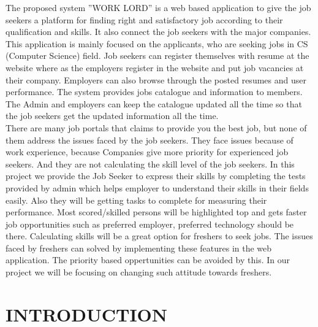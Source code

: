 \documentclass[a4paper,12pt]{report}
\begin{document}
The proposed system ”WORK LORD” is a web based application to give the
job seekers a platform for finding right and satisfactory job according to their qualification and skills. It also connect the job seekers with the major companies. This application is mainly focused on the applicants, who are seeking jobs in CS (Computer
Science) field. Job seekers can register themselves with resume at the website where as the
employers register in the website and put job vacancies at their
company. Employers can also browse through the posted resumes and user performance. The system provides jobs catalogue and information to members. The Admin and employers can
keep the catalogue updated all the time so that the job seekers get the updated information all the time.\\

There are many job portals that claims to provide you the best job, but none
of them address the issues faced by the job seekers. They face issues because of work experience, because Companies give more priority for experienced job seekers. And they are not calculating the skill level of the job seekers. In this project we provide the Job Seeker to express their skills by completing the tests provided by admin which helps employer to understand their skills in their fields easily. Also they will
be getting tasks to complete for measuring their performance. Most
scored/skilled persons will be highlighted top and gets faster job opportunities such as preferred employer, preferred technology should be there. Calculating skills will be a great option for freshers to seek jobs. The issues faced by freshers can solved by implementing these features in the web application. The priority based oppertunities can be avoided by this. In our project we will be focusing on changing
such attitude towards freshers.\\


\pagebreak

\tableofcontents{}
\pagebreak


\pagebreak

\listoffigures

\pagebreak

\listoftables

\pagebreak
{}
\chapter{INTRODUCTION}
\end{document}
